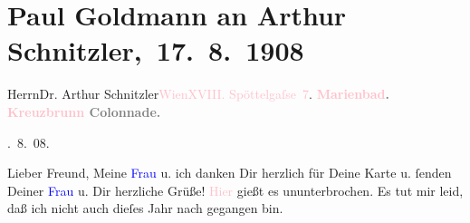 

\renewcommand{\erwaehntePersonen}{Personen: Eva Marie Goldmann, Olga Schnitzler}
\renewcommand{\erwaehnteOrte}{Orte: Berlin, Edmund-Weiß-Gasse, Kreuzbrunnen, Marienbad, Seis am Schlern, Südtirol, Tirol, Wien}
\renewcommand{\erwaehnteWerke}{}
\section[ Paul Goldmann an Arthur Schnitzler, 17. 8. 1908]{Paul Goldmann an Arthur Schnitzler, 17. 8. 1908}
\nopagebreak{}
\rehead{ }\normalsize\beginnumbering{}
\toendnotes[C]{\smallbreak\pagebreak[2]}
\toendnotes[C]{\smallbreak}\pstart{}{\pb}Herrn\pend{}\pstart{}Dr. Arthur Schnitzler\pend{}\pstart{}\textcolor{pink}{Wien}{}\ledrightnote{\textcolor{pink}{Wien}}\pend{}\pstart{}\textcolor{pink}{XVIII. Spöttelgaſse 7}{}\ledrightnote{\textcolor{pink}{Edmund-Weiß-Gasse}}.\pend{}
{\bigskip}
\pstart
           \noindent{}{\pb}\textcolor{gray}{\textbf{\textcolor{pink}{Marienbad}{}\ledrightnote{\textcolor{pink}{Marienbad}}. \textcolor{pink}{Kreuzbrunn}{}\ledrightnote{\textcolor{pink}{Kreuzbrunnen}} Colonnade.}}\pend
           
. 8. 08.\pend
           
\pstart{}Lieber Freund,\pend
\pstart
           Meine \textcolor{blue}{Frau}{}\ledrightnote{{$\rightarrow$}\textcolor{blue}{Eva Marie Goldmann}} u. ich danken Dir
               herzlich für Deine Karte u. ſenden Deiner \textcolor{blue}{Frau}{}\ledrightnote{{$\rightarrow$}\textcolor{blue}{Olga Schnitzler}} u. Dir herzliche Grüße! \textcolor{pink}{Hier}{}\ledrightnote{{$\rightarrow$}\textcolor{pink}{Marienbad}} gießt es ununterbrochen. Es tut mir
               leid, daß ich nicht auch dieſes Jahr nach \label{K_L03465-1v}\label{K_L03465-1h} gegangen bin.\pend
           
